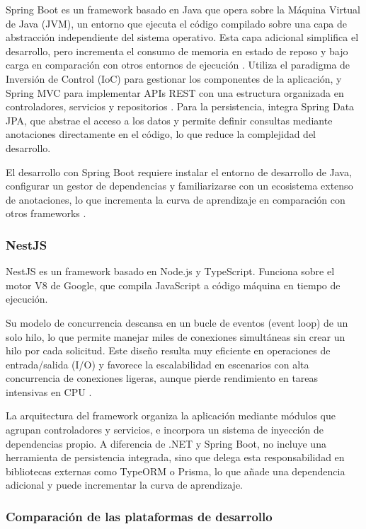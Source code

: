 Spring Boot es un framework basado en Java que opera sobre la Máquina Virtual de Java (JVM), un entorno que ejecuta el código compilado sobre una capa de abstracción independiente del sistema operativo. 
Esta capa adicional simplifica el desarrollo, pero incrementa el consumo de memoria en estado de reposo y bajo carga en comparación con otros entornos de ejecución \cite{spring_official}.
Utiliza el paradigma de Inversión de Control (IoC) para gestionar los componentes de la aplicación, y Spring MVC para implementar APIs REST con una estructura organizada en controladores, servicios y repositorios \cite{spring_in_action}. 
Para la persistencia, integra Spring Data JPA, que abstrae el acceso a los datos y permite definir consultas mediante anotaciones directamente en el código, lo que reduce la complejidad del desarrollo.

El desarrollo con Spring Boot requiere instalar el entorno de desarrollo de Java, configurar un gestor de dependencias y familiarizarse con un ecosistema extenso de anotaciones, lo que incrementa la curva de aprendizaje en comparación con otros frameworks \cite{spring_in_action}.

\subsubsection{NestJS}

NestJS es un framework basado en Node.js y TypeScript. 
Funciona sobre el motor V8 de Google, que compila JavaScript a código máquina en tiempo de ejecución. 

Su modelo de concurrencia descansa en un bucle de eventos (event loop) de un solo hilo, lo que permite manejar miles de conexiones simultáneas sin crear un hilo por cada solicitud.
Este diseño resulta muy eficiente en operaciones de entrada/salida (I/O) y favorece la escalabilidad en escenarios con alta concurrencia de conexiones ligeras, aunque pierde rendimiento en tareas intensivas en CPU \cite{nestjs_official}.

La arquitectura del framework organiza la aplicación mediante módulos que agrupan controladores y servicios, e incorpora un sistema de inyección de dependencias propio. 
A diferencia de .NET y Spring Boot, no incluye una herramienta de persistencia integrada, sino que delega esta responsabilidad en bibliotecas externas como TypeORM o Prisma, lo que añade una dependencia adicional y puede incrementar la curva de aprendizaje.

\subsubsection{Comparación de las plataformas de desarrollo}

